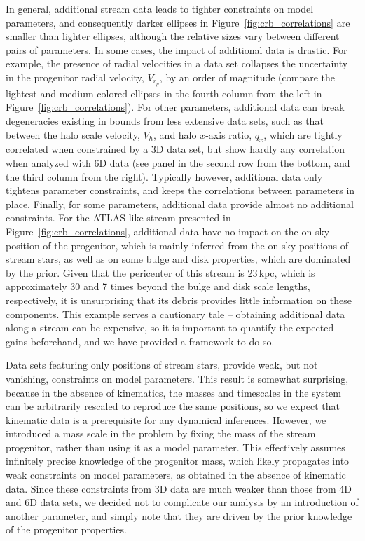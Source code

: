 \documentclass[modern]{aastex61}
\begin{document}
In general, additional stream data leads to tighter constraints on model parameters, and consequently darker ellipses in Figure~\ref{fig:crb_correlations} are smaller than lighter ellipses, although the relative sizes vary between different pairs of parameters.
In some cases, the impact of additional data is drastic.
For example, the presence of radial velocities in a data set collapses the uncertainty in the progenitor radial velocity, $V_{r_p}$, by an order of magnitude (compare the lightest and medium-colored ellipses in the fourth column from the left in Figure~\ref{fig:crb_correlations}).
For other parameters, additional data can break degeneracies existing in bounds from less extensive data sets, such as that between the halo scale velocity, $V_h$, and halo $x$-axis ratio, $q_x$, which are tightly correlated when constrained by a 3D data set, but show hardly any correlation when analyzed with 6D data (see panel in the second row from the bottom, and the third column from the right).
Typically however, additional data only tightens parameter constraints, and keeps the correlations between parameters in place.
Finally, for some parameters, additional data provide almost no additional constraints.
For the ATLAS-like stream presented in Figure~\ref{fig:crb_correlations}, additional data have no impact on the on-sky position of the progenitor, which is mainly inferred from the on-sky positions of stream stars, as well as on some bulge and disk properties, which are dominated by the prior.
Given that the pericenter of this stream is 23\,kpc, which is approximately 30 and 7 times beyond the bulge and disk scale lengths, respectively, it is unsurprising that its debris provides little information on these components.
This example serves a cautionary tale -- obtaining additional data along a stream can be expensive, so it is important to quantify the expected gains beforehand, and we have provided a framework to do so.

Data sets featuring only positions of stream stars, provide weak, but not vanishing, constraints on model parameters.
This result is somewhat surprising, because in the absence of kinematics, the masses and timescales in the system can be arbitrarily rescaled to reproduce the same positions, so we expect that kinematic data is a prerequisite for any dynamical inferences.
However, we introduced a mass scale in the problem by fixing the mass of the stream progenitor, rather than using it as a model parameter.
This effectively assumes infinitely precise knowledge of the progenitor mass, which likely propagates into weak constraints on model parameters, as obtained in the absence of kinematic data.
Since these constraints from 3D data are much weaker than those from 4D and 6D data sets, we decided not to complicate our analysis by an introduction of another parameter, and simply note that they are driven by the prior knowledge of the progenitor properties.
\end{document}
